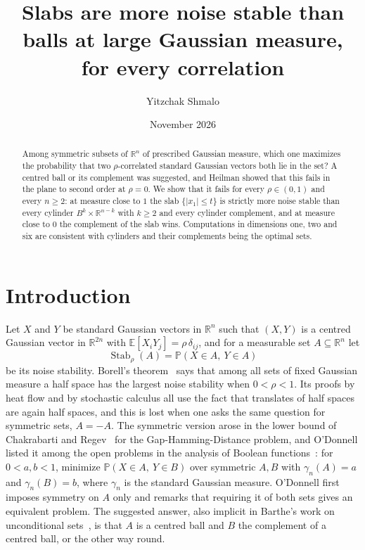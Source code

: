 \documentclass[11pt]{amsart}
\title[Slabs and balls in the symmetric Gaussian problem]{Slabs are more noise stable than balls at large Gaussian
measure, for every correlation}
\author{Yitzchak Shmalo}
\date{November 2026}
\theoremstyle{remark}
\newcommand{\R}{\mathbb{R}}
\newcommand{\E}{\mathbb{E}}
\newcommand{\Prob}{\mathbb{P}}
\newcommand{\Stab}{\operatorname{Stab}_\rho}
\begin{document}
\begin{abstract}
Among symmetric subsets of $\R^n$ of prescribed Gaussian measure, which one maximizes the probability that two
$\rho$-correlated standard Gaussian vectors both lie in the set? A centred ball or its complement was suggested, and
Heilman showed that this fails in the plane to second order at $\rho=0$. We show that it fails for every
$\rho\in(0,1)$ and every $n\ge2$: at measure close to $1$ the slab $\{|x_1|\le t\}$ is strictly more noise stable than
every cylinder $B^k\times\R^{n-k}$ with $k\ge2$ and every cylinder complement, and at measure close to $0$ the
complement of the slab wins. Computations in dimensions one, two and six are consistent with cylinders and their
complements being the optimal sets.
\end{abstract}
\maketitle

\section{Introduction}\label{sec:intro}

Let $X$ and $Y$ be standard Gaussian vectors in $\R^n$ such that $(X,Y)$ is a centred Gaussian vector in $\R^{2n}$
with $\E[X_iY_j]=\rho\,\delta_{ij}$, and for a measurable set
$A\subseteq\R^n$ let
\[
\Stab(A)=\Prob(X\in A,\ Y\in A)
\]
be its noise stability. Borell's theorem~\cite{Borell} says that among all sets of fixed Gaussian measure a half
space has the largest noise stability when $0<\rho<1$. Its proofs by heat flow and by stochastic calculus all use the
fact that translates of half spaces are again half spaces, and this is lost when one asks the same question for
symmetric sets, $A=-A$. The symmetric version arose in the lower bound of Chakrabarti and Regev~\cite{CR} for the
Gap-Hamming-Distance problem, and O'Donnell listed it among the open problems in the analysis of Boolean
functions~\cite{OD}: for $0<a,b<1$, minimize $\Prob(X\in A,\ Y\in B)$ over symmetric $A,B$ with $\gamma_n(A)=a$ and
$\gamma_n(B)=b$, where $\gamma_n$ is the standard Gaussian measure. O'Donnell first imposes symmetry on $A$ only and
remarks that requiring it of both sets gives an equivalent problem. The suggested answer, also implicit in
Barthe's work on unconditional sets~\cite{Barthe}, is that $A$ is a centred ball and $B$ the complement of a centred
ball, or the other way round.
\end{document}
